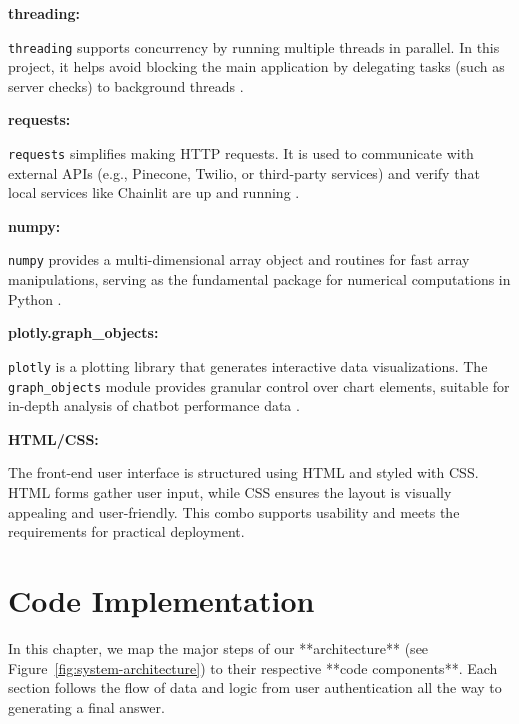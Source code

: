 \vspace{0.4cm}
\noindent\textbf{threading:}

\noindent
\texttt{threading} supports concurrency by running multiple threads in parallel. In this project, it helps 
avoid blocking the main application by delegating tasks (such as server checks) to background threads \cite{pythonlibrary}.

\vspace{0.4cm}
\noindent\textbf{requests:}

\noindent
\texttt{requests} simplifies making HTTP requests. It is used to communicate with external APIs (e.g., Pinecone, 
Twilio, or third-party services) and verify that local services like Chainlit are up and running \cite{pythonlibrary}.

\vspace{0.4cm}
\noindent\textbf{numpy:}

\noindent
\texttt{numpy} provides a multi-dimensional array object and routines for fast array manipulations, 
serving as the fundamental package for numerical computations in Python \cite{pythonlibrary}.

\vspace{0.4cm}
\noindent\textbf{plotly.graph\_objects:}

\noindent
\texttt{plotly} is a plotting library that generates interactive data visualizations. 
The \texttt{graph\_objects} module provides granular control over chart elements, 
suitable for in-depth analysis of chatbot performance data \cite{pythonlibrary}.

\vspace{1cm}
\noindent\textbf{HTML/CSS:}

The front-end user interface is structured using HTML and styled with CSS. HTML forms gather user input, 
while CSS ensures the layout is visually appealing and user-friendly. This combo supports usability 
and meets the requirements for practical deployment.


\section{Code Implementation}

In this chapter, we map the major steps of our **architecture** (see Figure~\ref{fig:system-architecture}) to their respective **code components**. Each section follows the flow of data and logic from user authentication all the way to generating a final answer.

